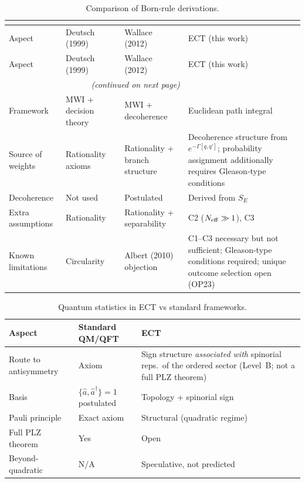 \documentclass[11pt,a4paper]{article}
\numberwithin{equation}{section}
\begin{document}
\begin{longtable}{@{}p{2.5cm}p{3.2cm}p{3.2cm}p{4.2cm}@{}}
\caption{Comparison of Born-rule derivations.} \\
\label{tab:born_comparison} \\[-6pt]
\toprule
Aspect & Deutsch (1999)~\cite{Deutsch1999} &
  Wallace (2012)~\cite{Wallace2012} &
  ECT (this work) \\
\midrule
\endfirsthead
\toprule
Aspect & Deutsch (1999)~\cite{Deutsch1999} &
  Wallace (2012)~\cite{Wallace2012} &
  ECT (this work) \\
\midrule
\endhead
\midrule\multicolumn{3}{r}{\small\textit{(continued on next page)}}\\
\endfoot
\bottomrule
\endlastfoot
Framework
  & MWI + decision theory
  & MWI + decoherence
  & Euclidean path integral \\
Source of weights
  & Rationality axioms
  & Rationality + branch structure
  & Decoherence structure from $e^{-\Gamma[q,q']}$; probability
    assignment additionally requires Gleason-type conditions \\
Decoherence
  & Not used
  & Postulated
  & Derived from $S_E$ \\
Extra assumptions
  & Rationality
  & Rationality + separability
  & C2 ($N_{\rm eff}\gg1$), C3 \\
Known limitations
  & Circularity~\cite{Barker2000}
  & Albert (2010) objection
  & C1--C3 necessary but not sufficient; Gleason-type
    conditions required; unique outcome selection open (OP23) \\
\hline

\end{longtable}


\begin{table}[h!]
\centering
\renewcommand{\arraystretch}{1.3}
\caption{Quantum statistics in ECT vs standard frameworks.}
\label{tab:statistics_comparison}
\begin{tabular}{@{}p{3.2cm}p{4.0cm}p{5.0cm}@{}}
\hline
Aspect & Standard QM/QFT & ECT \\
\hline
Route to antisymmetry & Axiom & Sign structure \emph{associated with} spinorial reps.\ of the ordered sector (Level~B; not a full PLZ theorem) \\
Basis & $\{\hat a,\hat a^\dagger\}=1$ postulated & Topology + spinorial sign \\
Pauli principle & Exact axiom & Structural (quadratic regime) \\
Full PLZ theorem & Yes & Open \\
Beyond-quadratic & N/A & Speculative, not predicted \\
\hline
\end{tabular}
\end{table}
\end{document}
